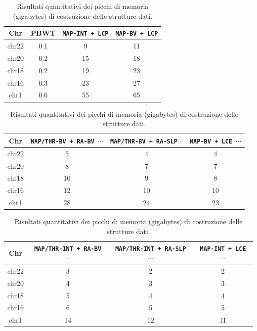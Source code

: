 \begin{table}
  \centering
  \caption{Risultati quantitativi dei picchi di memoria (gigabytes) di
    costruzione delle 
    strutture dati.} 
  \label{tab:makemem}
  \footnotesize
  \begin{tabular}{c||c|c|c} 
    \textbf{Chr}
    & \textbf{PBWT}
    & \textbf{\texttt{MAP-INT \newline+ LCP}}
    & \textbf{\texttt{MAP-BV \newline+ LCP}}\\
    \hline
    \hline
    chr22 & 0.1 & 9 & 11  \\
    chr20 & 0.2 & 15 & 18 \\
    chr18 & 0.2 & 19 & 23 \\
    chr16 & 0.3 & 23 & 27 \\
    chr1 & 0.6 & 55 & 65  \\
  \end{tabular}
  \vspace{+3mm}
  \vspace{+1mm}
  \begin{tabular}{c||c|c|c} 
    \textbf{Chr}
    & \textbf{\texttt{MAP/THR-BV + RA-BV $\cdots$}}
    & \textbf{\texttt{MAP/THR-BV + RA-SLP$\cdots$}}
    & \textbf{\texttt{MAP-BV + LCE $\cdots$}}\\
    \hline
    \hline
    chr22 & 5 & 4 & 4 \\
    chr20 & 8 & 7 & 7 \\
    chr18 & 10 & 9 & 8  \\
    chr16 & 12 & 10 & 10 \\
    chr1 & 28 & 24 & 23 \\
  \end{tabular}
  \vspace{+3mm}
  \vspace{+1mm}
  \begin{tabular}{c||c|c|c} 
    \textbf{Chr}
    & \textbf{\texttt{MAP/THR-INT + RA-BV $\cdots$}}
    & \textbf{\texttt{MAP/THR-INT + RA-SLP $\cdots$}}
    & \textbf{\texttt{MAP-INT + LCE $\cdots$}}\\
    \hline
    \hline
    chr22 & 3 & 2 & 2 \\
    chr20 & 4 & 3 & 3 \\
    chr18 & 5 & 4 & 4 \\
    chr16 & 6 & 5 & 5 \\
    chr1 & 14 & 12 & 11 
  \end{tabular}
\end{table}
